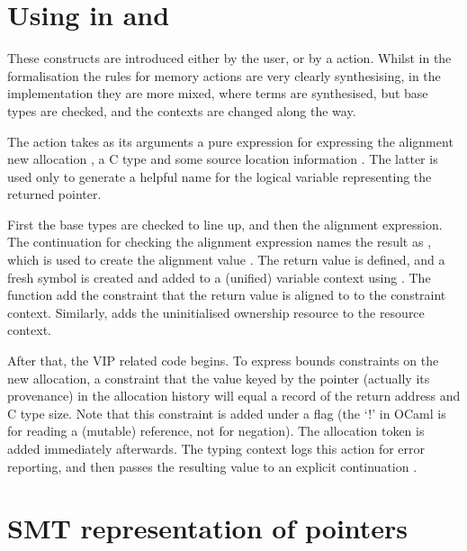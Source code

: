 \section{Using  in  and }

These constructs are introduced either by the user, or by a 
action. Whilst in the formalisation the rules for memory actions are very
clearly synthesising, in the implementation they are more mixed, where terms
are synthesised, but base types are checked, and the contexts are changed along
the way.

The  action takes as its arguments a pure expression for expressing
the alignment new allocation , a C type  and some
source location information . The latter is used only to generate
a helpful name for the logical variable representing the returned pointer.

First the base types are checked to line up, and then the alignment expression.
The continuation for checking the alignment expression names the result as
, which is used to create the alignment value
. The return value  is defined, and a
fresh symbol is created  and added to a (unified) variable
context using . The function  add the
constraint that the return value  is aligned to
 to the constraint context. Similarly, 
adds the uninitialised ownership resource to the resource context.


After that, the VIP related code begins. To express bounds constraints on the
new allocation, a constraint that the value keyed by the pointer (actually its
provenance) in the allocation history will equal a record of the return address
and C type size. Note that this constraint is added under a flag
 (the `!' in OCaml is for reading a (mutable) reference,
not for negation). The allocation token is added immediately afterwards. The
typing context logs this action for error reporting, and then passes the
resulting value to an explicit continuation .


\section{SMT representation of pointers}

